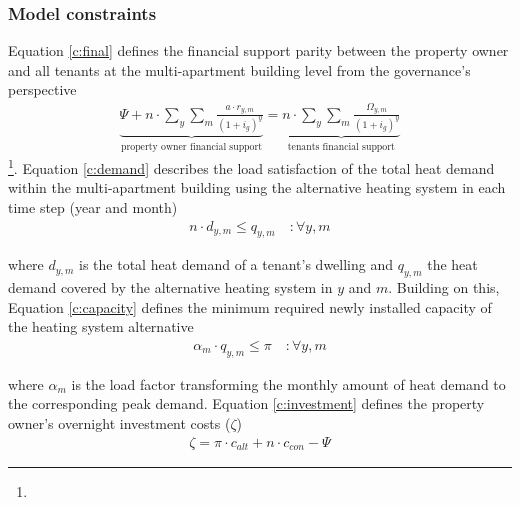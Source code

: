 \subsubsection{Model constraints}
Equation \ref{c:final} defines the financial support parity between the property owner and all tenants at the multi-apartment building level from the governance's perspective 
\begin{align}\label{c:final}
	\underbrace{\Psi +  n \cdot \sum_{y} \sum_{m} \frac{a \cdot r_{y,m}}{(1+i_{g})^y}}_{\text{property owner financial support}}= \underbrace{n \cdot \sum_{y} \sum_{m} \frac{\Omega_{y,m}}{(1+i_{g})^y}}_{\text{tenants financial support}}
\end{align}
\footnote{}. Equation \ref{c:demand} describes the load satisfaction of the total heat demand within the multi-apartment building using the alternative heating system in each time step (year and month) 
\begin{align}\label{c:demand}
n \cdot d_{y,m} \leq q_{y,m} \quad :\forall y,m
\end{align}

where $d_{y,m}$ is the total heat demand of a tenant's dwelling and $q_{y,m}$ the heat demand covered by the alternative heating system in $y$ and $m$. Building on this, Equation \ref{c:capacity} defines the minimum required newly installed capacity of the heating system alternative
\begin{align}\label{c:capacity}
\alpha_{m} \cdot q_{y,m} \leq \pi \quad :\forall y,m
\end{align}

where $\alpha_{m}$ is the load factor transforming the monthly amount of heat demand to the corresponding peak demand. Equation \ref{c:investment} defines the property owner's overnight investment costs ($\zeta$)
\begin{align}\label{c:investment}
\zeta = \pi \cdot c_{alt} + n \cdot c_{con} - \Psi
\end{align}

